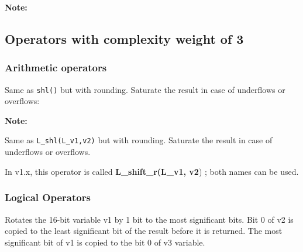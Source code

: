 \textbf{Note:} \hfill {}

\subsection{Operators with complexity weight of 3}
\subsubsection{Arithmetic operators}


Same as {\tt shl()} but with rounding. Saturate the result in case
of underflows or overflows:


\textbf{Note:} \hfill {}



Same as {\tt L\_shl(L\_v1,v2)} but with rounding. Saturate the
result in case of underflows or overflows.


In v1.x, this operator is called \textbf{L\_shift\_r(L\_v1, v2}) ;
both names can be used.

\subsubsection{Logical Operators}

 

Rotates the 16-bit variable v1 by 1 bit to the most significant
bits. Bit 0 of v2 is copied to the least significant bit of the
result before it is returned. The most significant bit of v1 is
copied to the bit 0 of v3 variable.

 

